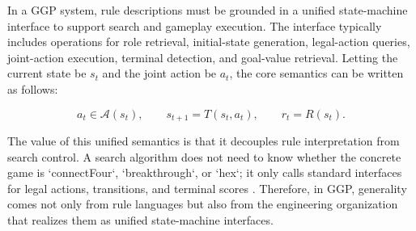 
In a GGP system, rule descriptions must be grounded in a unified state-machine interface to support search and gameplay execution. The interface typically includes operations for role retrieval, initial-state generation, legal-action queries, joint-action execution, terminal detection, and goal-value retrieval. Letting the current state be $s_t$ and the joint action be $a_t$, the core semantics can be written as follows:


\begin{equation}
a_t \in \mathcal{A}(s_t),\qquad
s_{t+1}=T(s_t,a_t),\qquad
r_t=R(s_t).
\end{equation}


The value of this unified semantics is that it decouples rule interpretation from search control. A search algorithm does not need to know whether the concrete game is `connectFour`, `breakthrough`, or `hex`; it only calls standard interfaces for legal actions, transitions, and terminal scores \cite{genesereth2005general}. Therefore, in GGP, generality comes not only from rule languages but also from the engineering organization that realizes them as unified state-machine interfaces.


